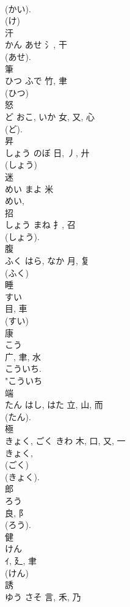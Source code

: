 \documentclass[8pt]{extreport}
\begin{document}
\begin{CJK}{UTF8}{min}
\\	(かい). 
\\	(け) 
\\	汗	
\\	かん	あせ	氵, 干	
\\	(あせ).	
\\	筆	
\\	ひつ	ふで	竹, 聿	
\\	(ひつ) 
\\	怒	
\\	ど	おこ, いか	女, 又, 心	
\\	(ど). 
\\	昇	
\\	しょう	のぼ	日, 丿, 廾	
\\	(しょう) 
\\	迷	
\\	めい	まよ	米		
\\	めい, 
\\	招	
\\	しょう	まね	扌, 召	
\\	(しょう). 
\\	腹	
\\	ふく	はら, なか	月, 复	
\\	(ふく) 
\\	睡	
\\	すい	
\\	目, 車	
\\	(すい) 
\\	康	
\\	こう	
\\	广, 聿, 水	
\\	こういち. 
\\	"こういち 
\\	端	
\\	たん	はし, はた	立, 山, 而	
\\	(たん). 
\\	極	
\\	きょく, ごく	きわ	木, 口, 又, 一		
\\	きょく, 
\\	(ごく) 
\\	(きょく). 
\\	郎	
\\	ろう	
\\	良, 阝	
\\	(ろう).	
\\	健	
\\	けん	
\\	ｲ, 廴, 聿	
\\	(けん) 
\\	誘	
\\	ゆう	さそ	言, 禾, 乃	

\end{CJK}
\end{document}
